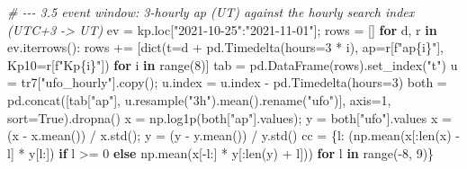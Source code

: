 \documentclass[
  10pt,
  a4paper,
]{article}
\newenvironment{Shaded}{}{}
\newcommand{\BuiltInTok}[1]{#1}
\newcommand{\CommentTok}[1]{\textit{#1}}
\newcommand{\ControlFlowTok}[1]{\textbf{#1}}
\newcommand{\DecValTok}[1]{#1}
\newcommand{\KeywordTok}[1]{\textbf{#1}}
\newcommand{\NormalTok}[1]{#1}
\newcommand{\OperatorTok}[1]{#1}
\newcommand{\SpecialCharTok}[1]{#1}
\newcommand{\SpecialStringTok}[1]{#1}
\newcommand{\StringTok}[1]{#1}
\newcommand{\VariableTok}[1]{#1}
\begin{document}
\begin{Shaded}
\begin{Highlighting}[]
\CommentTok{\# {-}{-}{-} 3.5  event window: 3{-}hourly ap (UT) against the hourly search index (UTC+3 {-}\textgreater{} UT)}
\NormalTok{ev }\OperatorTok{=}\NormalTok{ kp.loc[}\StringTok{"2021{-}10{-}25"}\NormalTok{:}\StringTok{"2021{-}11{-}01"}\NormalTok{]}\OperatorTok{;}\NormalTok{ rows }\OperatorTok{=}\NormalTok{ []}
\ControlFlowTok{for}\NormalTok{ d, r }\KeywordTok{in}\NormalTok{ ev.iterrows():}
\NormalTok{    rows }\OperatorTok{+=}\NormalTok{ [}\BuiltInTok{dict}\NormalTok{(t}\OperatorTok{=}\NormalTok{d }\OperatorTok{+}\NormalTok{ pd.Timedelta(hours}\OperatorTok{=}\DecValTok{3} \OperatorTok{*}\NormalTok{ i), ap}\OperatorTok{=}\NormalTok{r[}\SpecialStringTok{f"ap}\SpecialCharTok{\{}\NormalTok{i}\SpecialCharTok{\}}\SpecialStringTok{"}\NormalTok{], Kp10}\OperatorTok{=}\NormalTok{r[}\SpecialStringTok{f"Kp}\SpecialCharTok{\{}\NormalTok{i}\SpecialCharTok{\}}\SpecialStringTok{"}\NormalTok{])}
             \ControlFlowTok{for}\NormalTok{ i }\KeywordTok{in} \BuiltInTok{range}\NormalTok{(}\DecValTok{8}\NormalTok{)]}
\NormalTok{tab }\OperatorTok{=}\NormalTok{ pd.DataFrame(rows).set\_index(}\StringTok{"t"}\NormalTok{)}
\NormalTok{u }\OperatorTok{=}\NormalTok{ tr7[}\StringTok{"ufo\_hourly"}\NormalTok{].copy()}\OperatorTok{;}\NormalTok{ u.index }\OperatorTok{=}\NormalTok{ u.index }\OperatorTok{{-}}\NormalTok{ pd.Timedelta(hours}\OperatorTok{=}\DecValTok{3}\NormalTok{)}
\NormalTok{both }\OperatorTok{=}\NormalTok{ pd.concat([tab[}\StringTok{"ap"}\NormalTok{], u.resample(}\StringTok{"3h"}\NormalTok{).mean().rename(}\StringTok{"ufo"}\NormalTok{)], axis}\OperatorTok{=}\DecValTok{1}\NormalTok{,}
\NormalTok{                 sort}\OperatorTok{=}\VariableTok{True}\NormalTok{).dropna()}
\NormalTok{x }\OperatorTok{=}\NormalTok{ np.log1p(both[}\StringTok{"ap"}\NormalTok{].values)}\OperatorTok{;}\NormalTok{ y }\OperatorTok{=}\NormalTok{ both[}\StringTok{"ufo"}\NormalTok{].values}
\NormalTok{x }\OperatorTok{=}\NormalTok{ (x }\OperatorTok{{-}}\NormalTok{ x.mean()) }\OperatorTok{/}\NormalTok{ x.std()}\OperatorTok{;}\NormalTok{ y }\OperatorTok{=}\NormalTok{ (y }\OperatorTok{{-}}\NormalTok{ y.mean()) }\OperatorTok{/}\NormalTok{ y.std()}
\NormalTok{cc }\OperatorTok{=}\NormalTok{ \{l: (np.mean(x[:}\BuiltInTok{len}\NormalTok{(x) }\OperatorTok{{-}}\NormalTok{ l] }\OperatorTok{*}\NormalTok{ y[l:]) }\ControlFlowTok{if}\NormalTok{ l }\OperatorTok{\textgreater{}=} \DecValTok{0} \ControlFlowTok{else}\NormalTok{ np.mean(x[}\OperatorTok{{-}}\NormalTok{l:] }\OperatorTok{*}\NormalTok{ y[:}\BuiltInTok{len}\NormalTok{(y) }\OperatorTok{+}\NormalTok{ l]))}
      \ControlFlowTok{for}\NormalTok{ l }\KeywordTok{in} \BuiltInTok{range}\NormalTok{(}\OperatorTok{{-}}\DecValTok{8}\NormalTok{, }\DecValTok{9}\NormalTok{)\}}

\end{Highlighting}
\end{Shaded}
\end{document}
